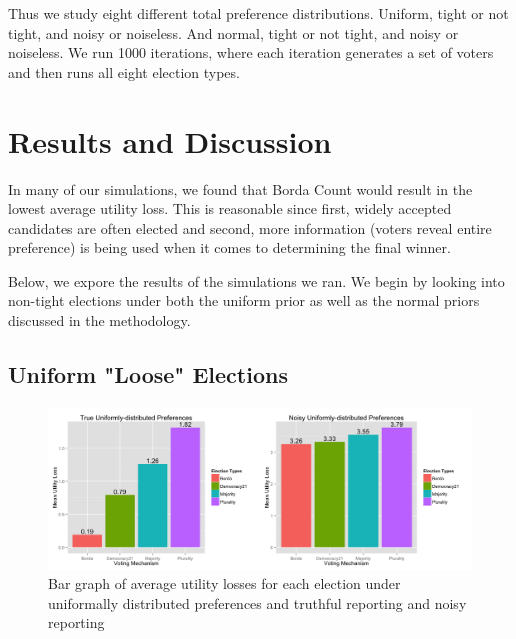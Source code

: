 \documentclass[11pt]{scrartcl}
\begin{document}
Thus we study eight different total preference distributions. Uniform, tight or not tight, and noisy or noiseless. And normal, tight or not tight, and noisy or noiseless. We run 1000 iterations, where each iteration generates a set of voters and then runs all eight election types.

\section{Results and Discussion}

In many of our simulations, we found that Borda Count would result in the lowest average utility loss. This is reasonable since first, widely accepted candidates are often elected and second, more information (voters reveal entire preference) is being used when it comes to determining the final winner.  

Below, we expore the results of the simulations we ran. We begin by looking into non-tight elections under both the uniform prior as well as the normal priors discussed in the methodology.

\subsection{Uniform "Loose" Elections}
\begin{figure}[H]\center
\includegraphics[scale=0.38]{uniform.png}
\caption{Bar graph of average utility losses for each election under uniformally distributed preferences and truthful reporting and noisy reporting}
\end{figure}

\end{document}
